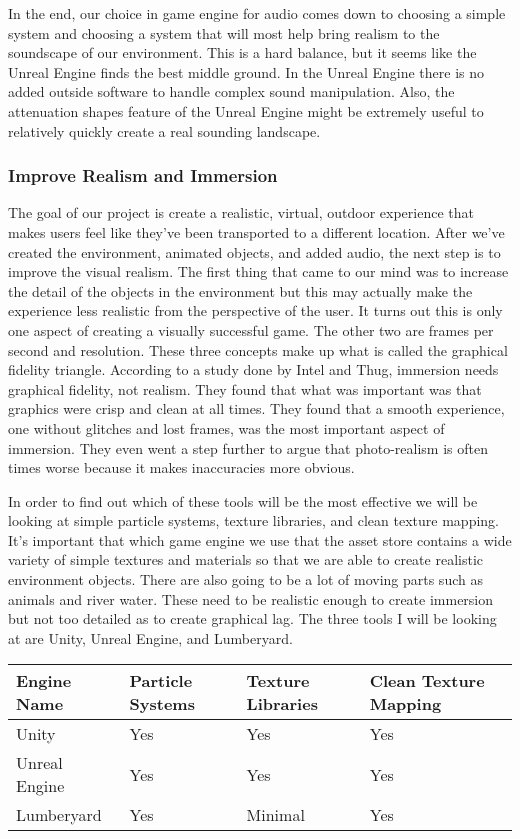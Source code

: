 \documentclass[10pt,journal,compsoc,onecolumn, draftclsnofoot]{IEEEtran}
\begin{document}
In the end, our choice in game engine for audio comes down to choosing a simple system and choosing a system that will most help bring realism to the soundscape of our environment.  This is a hard balance, but it seems like the Unreal Engine finds the best middle ground.  In the Unreal Engine there is no added outside software to handle complex sound manipulation.  Also, the attenuation shapes feature of the Unreal Engine might be extremely useful to relatively quickly create a real sounding landscape.

\subsubsection{Improve Realism and Immersion}
The goal of our project is create a realistic, virtual, outdoor experience that makes users feel like they’ve been transported to a different location.
After we’ve created the environment, animated objects, and added audio, the next step is to improve the visual realism.
The first thing that came to our mind was to increase the detail of the objects in the environment but this may actually make the experience less realistic from the perspective of the user.
It turns out this is only one aspect of creating a visually successful game.
The other two are frames per second and resolution.
These three concepts make up what is called the graphical fidelity triangle.
According to a study done by Intel and Thug\cite{michalak_lind_round1}, immersion needs graphical fidelity, not realism.
They found that what was important was that graphics were crisp and clean at all times.
They found that a smooth experience, one without glitches and lost frames, was the most important aspect of immersion.
They even went a step further to argue that photo-realism is often times worse because it makes inaccuracies more obvious.

In order to find out which of these tools will be the most effective we will be looking at simple particle systems, texture libraries, and clean texture mapping.
It’s important that which game engine we use that the asset store contains a wide variety of simple textures and materials so that we are able to create realistic environment objects.
There are also going to be a lot of moving parts such as animals and river water.
These need to be realistic enough to create immersion but not too detailed as to create graphical lag.
The three tools I will be looking at are Unity, Unreal Engine, and Lumberyard.

\vspace{2mm}
\begin{table}[h!]
\centering
  \begin{tabu} to 1.0\textwidth { | X[l] || X[c] | X[c] | X[c] |  }
  \hline
  Engine Name & Particle Systems & Texture Libraries & Clean Texture Mapping\\
  \hline
  Unity  & Yes & Yes & Yes\\
  Unreal Engine & Yes & Yes & Yes\\
  Lumberyard & Yes & Minimal & Yes \\
  \hline
  \end{tabu}
\end{table}
\vspace{2mm}
\end{document}
